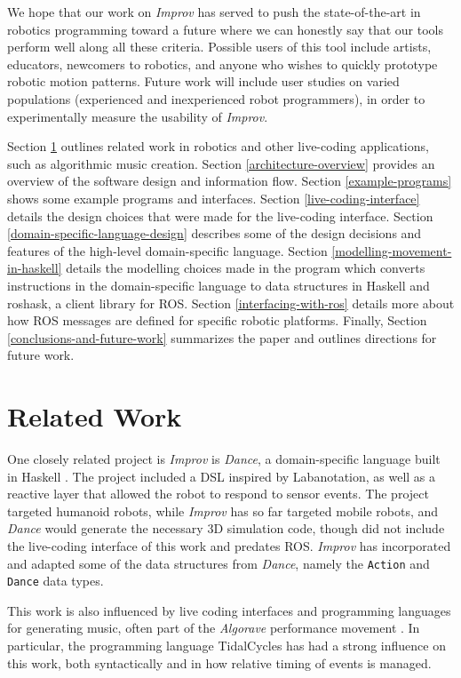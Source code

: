 \documentclass[sigconf]{acmart}
\begin{document}
We hope that our work on \emph{Improv} has served to push the state-of-the-art
in robotics programming toward a future where we can honestly say that our tools
perform well along all these criteria. Possible users of this tool include
artists, educators, newcomers to robotics, and anyone who wishes to quickly
prototype robotic motion patterns. Future work will include user studies on
varied populations (experienced and inexperienced robot programmers), in order
to experimentally measure the usability of \emph{Improv}.

Section \ref{related-work} outlines related work in robotics and other
live-coding applications, such as algorithmic music creation. Section
\ref{architecture-overview} provides an overview of the software design and
information flow. Section \ref{example-programs} shows some example programs and
interfaces. Section \ref{live-coding-interface} details the design choices that
were made for the live-coding interface. Section
\ref{domain-specific-language-design} describes some of the design decisions and
features of the high-level domain-specific language. Section
\ref{modelling-movement-in-haskell} details the modelling choices made in the
program which converts instructions in the domain-specific language to data
structures in Haskell and roshask, a client library for ROS.
Section \ref{interfacing-with-ros} details more about how ROS messages are
defined for specific robotic platforms. Finally, Section
\ref{conclusions-and-future-work} summarizes the paper and outlines directions
for future work.

\section{Related Work}\label{related-work}


One closely related project is \emph{Improv} is \emph{Dance}, a
domain-specific language built in Haskell \cite{Dance2003}. The project included
a DSL inspired by Labanotation, as well as a reactive layer that allowed
the robot to respond to sensor events. The project targeted humanoid
robots, while \emph{Improv} has so far targeted mobile robots, and
\emph{Dance} would generate the necessary 3D simulation code, though did
not include the live-coding interface of this work and predates ROS.
\emph{Improv} has incorporated and adapted some of the data structures
from \emph{Dance}, namely the \texttt{Action} and \texttt{Dance} data
types.

This work is also influenced by live coding interfaces and programming languages
for generating music, often part of the \emph{Algorave} performance movement
\cite{collins2014algorave}. In particular, the programming language TidalCycles
\cite{mclean2010tidal} has had a strong influence on this work, both
syntactically and in how relative timing of events is managed.
\end{document}
